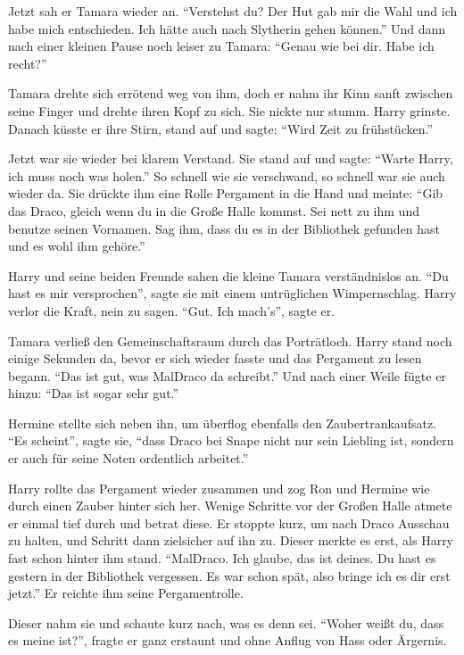 Jetzt sah er Tamara wieder an. \enquote{Verstehst du? Der Hut gab mir die Wahl und ich habe mich entschieden. Ich hätte auch nach Slytherin gehen können.} Und dann nach einer kleinen Pause noch leiser zu Tamara: \enquote{Genau wie bei dir. Habe ich recht?}

Tamara drehte sich errötend weg von ihm, doch er nahm ihr Kinn sanft zwischen seine Finger und drehte ihren Kopf zu sich. Sie nickte nur stumm. Harry grinste. Danach küsste er ihre Stirn, stand auf und sagte: \enquote{Wird Zeit zu frühstücken.}

Jetzt war sie wieder bei klarem Verstand. Sie stand auf und sagte: \enquote{Warte Harry, ich muss noch was holen.} So schnell wie sie verschwand, so schnell war sie auch wieder da. Sie drückte ihm eine Rolle Pergament in die Hand und meinte: \enquote{Gib das Draco, gleich wenn du in die Große Halle kommst. Sei nett zu ihm und benutze seinen Vornamen. Sag ihm, dass du es in der Bibliothek gefunden hast und es wohl ihm gehöre.}

Harry und seine beiden Freunde sahen die kleine Tamara verständnislos an. \enquote{Du hast es mir versprochen}, sagte sie mit einem untrüglichen Wimpernschlag. Harry verlor die Kraft, nein zu sagen. \enquote{Gut. Ich mach's}, sagte er.

Tamara verließ den Gemeinschaftsraum durch das Porträtloch. Harry stand noch einige Sekunden da, bevor er sich wieder fasste und das Pergament zu lesen begann. \enquote{Das ist gut, was Mal\gst Draco da schreibt.} Und nach einer Weile fügte er hinzu: \enquote{Das ist sogar sehr gut.}

Hermine stellte sich neben ihn, um überflog ebenfalls den Zaubertrankaufsatz. \enquote{Es scheint}, sagte sie, \enquote{dass Draco bei Snape nicht nur sein Liebling ist, sondern er auch für seine Noten ordentlich arbeitet.}

Harry rollte das Pergament wieder zusammen und zog Ron und Hermine wie durch einen Zauber hinter sich her. Wenige Schritte vor der Großen Halle atmete er einmal tief durch und betrat diese. Er stoppte kurz, um nach Draco Ausschau zu halten, und Schritt dann zielsicher auf ihn zu. Dieser merkte es erst, als Harry fast schon hinter ihm stand. \enquote{Mal\gst Draco. Ich glaube, das ist deines. Du hast es gestern in der Bibliothek vergessen. Es war schon spät, also bringe ich es dir erst jetzt.} Er reichte ihm seine Pergamentrolle.

Dieser nahm sie und schaute kurz nach, was es denn sei. \enquote{Woher weißt du, dass es meine ist?}, fragte er ganz erstaunt und ohne Anflug von Hass oder Ärgernis.

